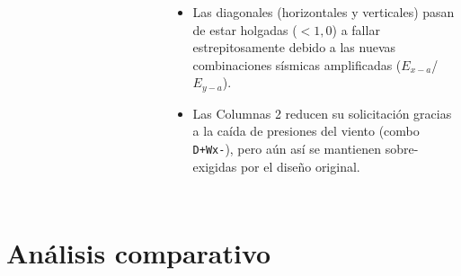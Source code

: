 \documentclass[11.5pt,aspectratio=169,handout]{beamer}
\begin{document}
\begin{frame}
\begin{columns}[T,totalwidth=\textwidth]
{\begin{tabular}{@{}llrrrrl@{}}
    \bottomrule
  \end{tabular}
  }\\[3mm]
  \begin{itemize}\scriptsize\setlength{\itemsep}{1mm}
    \item Las \alert{diagonales (horizontales y verticales)} pasan de estar holgadas ($<1{,}0$) a fallar estrepitosamente debido a las nuevas combinaciones sísmicas amplificadas ($E_{x-a}$/$E_{y-a}$).
    \item Las \alert{Columnas 2} reducen su solicitación gracias a la caída de presiones del viento (combo \texttt{D+Wx-}), pero aún así se mantienen sobre-exigidas por el diseño original.
  \end{itemize}
\end{columns}
\end{frame}

\section{Análisis comparativo}
\end{document}
